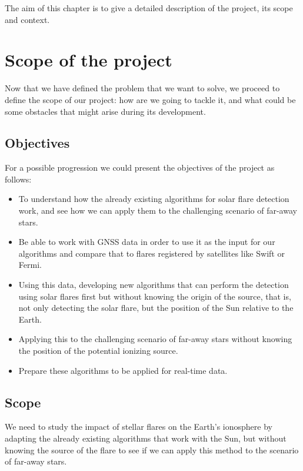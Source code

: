 The aim of this chapter is to give a detailed description of the project, its scope and context.\\


\section{Scope of the project}

Now that we have defined the problem that we want to solve, we proceed to define the scope of our project: how are we going to tackle it, and what could be some obstacles that might arise during its development.

\subsection{Objectives}

For a possible progression we could present the objectives of the project as follows:

\begin{itemize}
  \item To understand how the already existing algorithms for solar flare detection work, and see how we can apply them to the challenging scenario of far-away stars.
  \item Be able to work with GNSS data in order to use it as the input for our algorithms and compare that to flares registered by satellites like Swift or Fermi.
  \item Using this data, developing new algorithms that can perform the detection using solar flares first but without knowing the origin of the source, that is, not only detecting the solar flare, but the position of the Sun relative to the Earth.
  \item Applying this to the challenging scenario of far-away stars without knowing the position of the potential ionizing source.
  \item Prepare these algorithms to be applied for real-time data.
\end{itemize}

\subsection{Scope}

We need to study the impact of stellar flares on the Earth’s ionosphere by adapting the already existing algorithms that work with the Sun, but without knowing the source of the flare to see if we can apply this method to the scenario of far-away stars.\\

